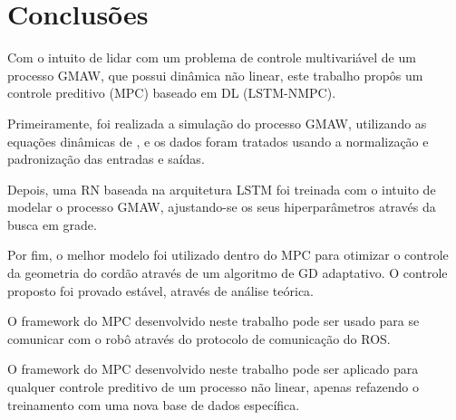\chapter{Conclusões}
\label{chap6}
Com o intuito de lidar com um problema de controle multivariável de um processo GMAW, que possui dinâmica não linear, este trabalho propôs um controle preditivo (MPC) baseado em DL (LSTM-NMPC).

Primeiramente, foi realizada a simulação do processo GMAW, utilizando as equações dinâmicas de \cite{bendia2021multivariable}, e os dados foram tratados usando a normalização e padronização das entradas e saídas.

Depois, uma RN baseada na arquitetura LSTM foi treinada com o intuito de modelar o processo GMAW, ajustando-se os seus hiperparâmetros através da busca em grade.

Por fim, o melhor modelo foi utilizado dentro do MPC para otimizar o controle da geometria do cordão através de um algoritmo de GD adaptativo. O controle proposto foi provado estável, através de análise teórica.

O framework do MPC desenvolvido neste trabalho pode ser usado para se comunicar com o robô através do protocolo de comunicação do ROS.

O framework do MPC desenvolvido neste trabalho pode ser aplicado para qualquer controle preditivo de um processo não linear, apenas refazendo o treinamento com uma nova base de dados específica.
